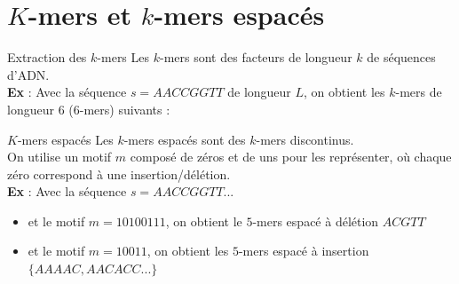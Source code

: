 \documentclass[11pt]{beamer}
\begin{document}
\section{$K$-mers et $k$-mers espacés}
\begin{frame}[fragile]{Extraction des $k$-mers}
  Les $k$-mers sont des facteurs de longueur $k$ de séquences d'ADN.\medskip\\\pause
  \textbf{Ex} : Avec la séquence $s = AACCGGTT$ de longueur $L$, on obtient les $k$-mers de longueur $6$ ($6$-mers) suivants :\\\pause
  \begin{center}\end{center}
\end{frame}
\begin{frame}[fragile]{$K$-mers espacés}
  Les $k$-mers espacés sont des $k$-mers discontinus.\pause\medskip\\
  On utilise un motif $m$ composé de zéros et de uns pour les représenter, où chaque zéro correspond à une insertion/délétion.\medskip\pause\\
  \textbf{Ex} : Avec la séquence $s=AACCGGTT$...\pause
  \begin{itemize}[<+-| alert@+>]
    \item et le motif $m=10100111$, on obtient le $5$-mers espacé à délétion $ACGTT$
    \item et le motif $m=10011$, on obtient les $5$-mers espacé à insertion $\{AAAAC, AACACC...\}$
  \end{itemize}
\end{frame}
\end{document}
